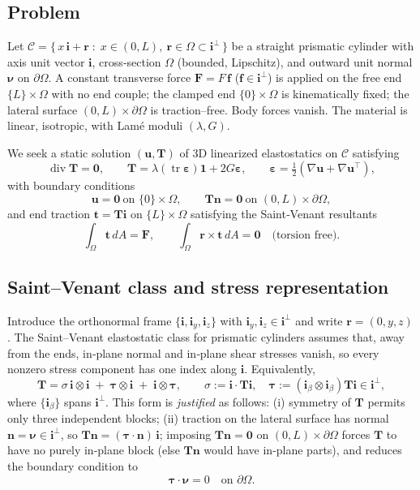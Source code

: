 \subsection*{Problem}

Let $\mathcal{C}=\{\,x\,\mathbf{i}+\bm{r}\;:\;x\in(0,L),\ \bm{r}\in\Omega\subset\mathbf{i}^\perp\,\}$ be a straight prismatic cylinder with axis unit vector $\mathbf{i}$, cross‐section $\Omega$ (bounded, Lipschitz), and outward unit normal $\bm{\nu}$ on $\partial\Omega$. A constant transverse force $\bm{F}=F\,\bm{f}$ ($\bm{f}\in\mathbf{i}^\perp$) is applied on the free end $\{L\}\times\Omega$ with no end couple; the clamped end $\{0\}\times\Omega$ is kinematically fixed; the lateral surface $(0,L)\times\partial\Omega$ is traction–free. Body forces vanish. The material is linear, isotropic, with Lamé moduli $(\lambda,G)$.

We seek a static solution $(\bm{u},\bm{T})$ of 3D linearized elastostatics on $\mathcal{C}$ satisfying
\[
\operatorname{div}\bm{T}=\mathbf{0},
\qquad 
\bm{T}=\lambda(\operatorname{tr}\bm{\varepsilon})\mathbf{1}+2G\bm{\varepsilon},
\qquad 
\bm{\varepsilon}=\tfrac12(\nabla\bm{u}+\nabla\bm{u}^{\!\top}),
\]
with boundary conditions
\[
\bm{u}=\mathbf{0}\ \text{on }\{0\}\times\Omega,\qquad
\bm{T}\bm{n}=\mathbf{0}\ \text{on }(0,L)\times\partial\Omega,
\]
and end traction $\bm{t}=\bm{T}\mathbf{i}$ on $\{L\}\times\Omega$ satisfying the Saint‐Venant resultants
\[
\int_\Omega \bm{t}\,dA=\bm{F},\qquad 
\int_\Omega \bm{r}\times\bm{t}\,dA=\mathbf{0}\quad\text{(torsion free)}.
\]

\subsection*{Saint–Venant class and stress representation}

Introduce the orthonormal frame $\{\mathbf{i},\mathbf{i}_y,\mathbf{i}_z\}$ with $\mathbf{i}_y,\mathbf{i}_z\in\mathbf{i}^\perp$ and write $\bm{r}=(0,y,z)$. 
The Saint–Venant elastostatic class for prismatic cylinders assumes that, away from the ends, in‐plane normal and in‐plane shear stresses vanish, so every nonzero stress component has one index along $\mathbf{i}$. 
Equivalently,
\begin{equation}
\bm{T}
=\sigma\,\mathbf{i}\otimes\mathbf{i}\;+\;\bm{\tau}\otimes\mathbf{i}\;+\;\mathbf{i}\otimes\bm{\tau},
\qquad
\sigma:=\mathbf{i}\cdot\bm{T}\mathbf{i},\quad
\bm{\tau}:=(\mathbf{i}_\beta\otimes\mathbf{i}_\beta)\bm{T}\mathbf{i}\in\mathbf{i}^\perp,
\label{eq:frame-stress-tensor}
\end{equation}
where $\{\mathbf{i}_\beta\}$ spans $\mathbf{i}^\perp$. 
This form is \emph{justified} as follows:
(i) symmetry of $\bm{T}$ permits only three independent blocks; 
(ii) traction on the lateral surface has normal $\bm{n}=\bm{\nu}\in\mathbf{i}^\perp$, so $\bm{T}\bm{n}=(\bm{\tau}\cdot\bm{n})\,\mathbf{i}$; imposing $\bm{T}\bm{n}=\mathbf{0}$ on $(0,L)\times\partial\Omega$ forces $\bm{T}$ to have no purely in‐plane block (else $\bm{T}\bm{n}$ would have in‐plane parts), and reduces the boundary condition to
\begin{equation}
\bm{\tau}\cdot\bm{\nu}=0\quad\text{on }\partial\Omega.
\label{eq:side-BC}
\end{equation}

